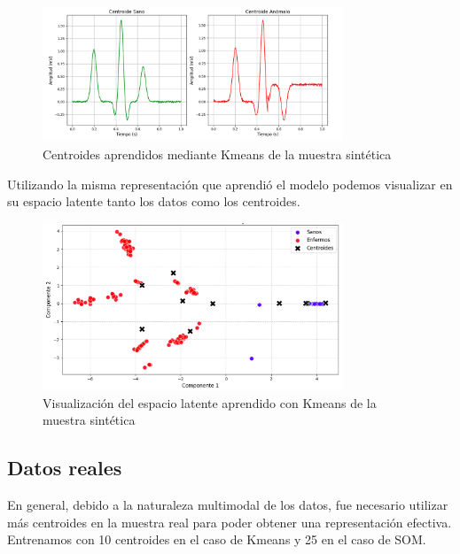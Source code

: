 \documentclass[titlepage,a4paper]{article}
\begin{document}
\begin{figure}[H] %
    \centering
    \includegraphics[width=0.8\textwidth]{ecg_centroides_sinteticos.png} %
    \caption{Centroides aprendidos mediante Kmeans de la muestra sintética}
    \label{fig:mi_figura} %
\end{figure}
Utilizando la misma representación que aprendió el modelo podemos visualizar en su espacio latente tanto los datos como los centroides.

\begin{figure}[H] %
    \centering
    \includegraphics[width=0.8\textwidth]{visualizacion_kmeans_sinteticos.png} %
    \caption{Visualización del espacio latente aprendido con Kmeans de la muestra sintética}
    \label{fig:mi_figura} %
\end{figure}

\subsection{Datos reales}
En general, debido a la naturaleza multimodal de los datos, fue necesario utilizar más centroides en la muestra real para poder obtener una representación efectiva. Entrenamos con 10 centroides en el caso de Kmeans y 25 en el caso de SOM.
\end{document}
